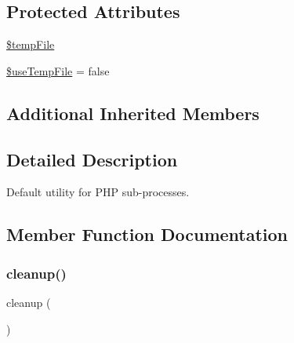 \subsection*{Protected Attributes}
\begin{DoxyCompactItemize}
\item 
\mbox{\hyperlink{class_p_h_p_unit___util___p_h_p___default_a6870df4ced2ffe74c901004b361f206b}{\$temp\+File}}
\item 
\mbox{\hyperlink{class_p_h_p_unit___util___p_h_p___default_a113533f069a8ccbf5509a9c20da7643f}{\$use\+Temp\+File}} = false
\end{DoxyCompactItemize}
\subsection*{Additional Inherited Members}


\subsection{Detailed Description}
Default utility for P\+HP sub-\/processes. 

\subsection{Member Function Documentation}
\mbox{\label{class_p_h_p_unit___util___p_h_p___default_aff07c1d29d6d6a540c726948254a1764}} 
\subsubsection{\texorpdfstring{cleanup()}{cleanup()}}
{\footnotesize\ttfamily cleanup (\begin{DoxyParamCaption}{ }\end{DoxyParamCaption})\hspace{0.3cm}{\ttfamily [protected]}}

\mbox{\label{class_p_h_p_unit___util___p_h_p___default_ae5dbd216c09bda4ea76d2ca28e27eb00}} 
